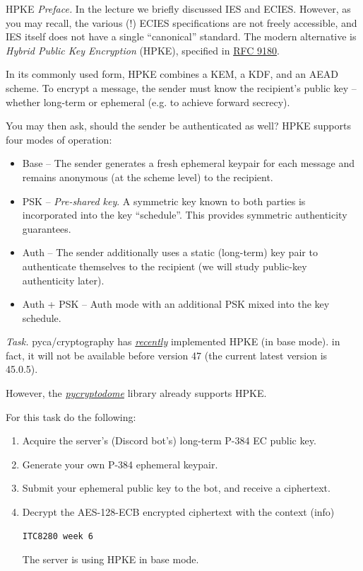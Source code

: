 \documentclass{practice}
\begin{document}
\begin{task}{HPKE}
  \textit{Preface.}
  In the lecture we briefly discussed IES and ECIES.
  However, as you may recall, the various (!) ECIES specifications are not freely accessible, and IES itself does not have a single \enquote{canonical} standard.
  The modern alternative is \emph{Hybrid Public Key Encryption} (HPKE), specified in \href{https://datatracker.ietf.org/doc/html/rfc9180}{RFC 9180}.

  In its commonly used form, HPKE combines a KEM, a KDF, and an AEAD scheme.
  To encrypt a message, the sender must know the recipient's public key -- whether long-term or ephemeral (e.g. to achieve forward secrecy).

  You may then ask, should the sender be authenticated as well?
  HPKE supports four modes of operation:
  \begin{itemize}
    \item Base -- The sender generates a fresh ephemeral keypair for each message and remains anonymous (at the scheme level) to the recipient.
    \item PSK -- \emph{Pre-shared key}.
    A symmetric key known to both parties is incorporated into the key \enquote{schedule}.
    This provides symmetric authenticity guarantees.
    \item Auth -- The sender additionally uses a static (long-term) key pair to authenticate themselves to the recipient (we will study public-key authenticity later).
    \item Auth + PSK -- Auth mode with an additional PSK mixed into the key schedule.
  \end{itemize}

  \textit{Task.}
  pyca/cryptography has \href{https://github.com/pyca/cryptography/pull/14126}{\emph{recently}} implemented HPKE (in base mode).
  in fact, it will not be available before version 47 (the current latest version is 45.0.5).

  However, the \href{https://pycryptodome.readthedocs.io/en/latest/src/protocol/hpke.html}{\emph{pycryptodome}} library already supports HPKE.

  For this task do the following:
  \begin{enumerate}
    \item Acquire the server's (Discord bot's) long-term P-384 EC public key.
    \item Generate your own P-384 ephemeral keypair.
    \item Submit your ephemeral public key to the bot, and receive a ciphertext.
    \item Decrypt the AES-128-ECB encrypted ciphertext with the context (info)
    \begin{Verbatim}
ITC8280 week 6
    \end{Verbatim}
    The server is using HPKE in base mode.
  \end{enumerate}
\end{task}
\end{document}
